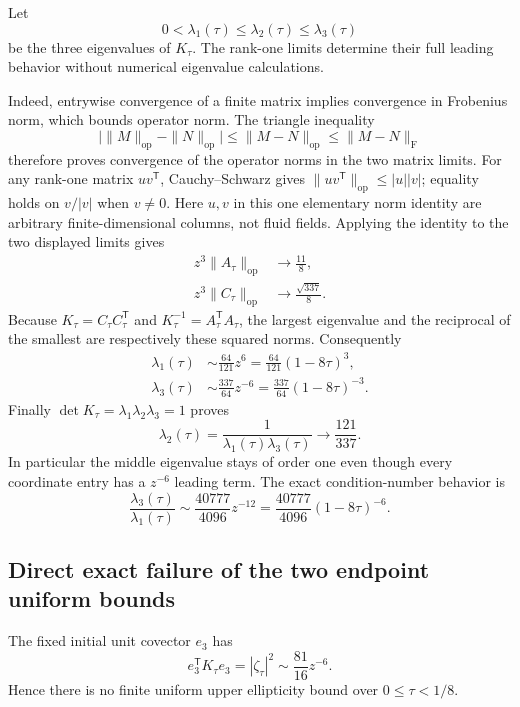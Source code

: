 Let
\[
0<\lambda_1(\tau)\le\lambda_2(\tau)\le\lambda_3(\tau)
\]
be the three eigenvalues of \(K_\tau\). The rank-one limits determine
their full leading behavior without numerical eigenvalue calculations.

Indeed, entrywise convergence of a finite matrix implies convergence in
Frobenius norm, which bounds operator norm. The triangle inequality
\[
\bigl|\|M\|_{\mathrm{op}}-\|N\|_{\mathrm{op}}\bigr|
\le\|M-N\|_{\mathrm{op}}
\le\|M-N\|_{\mathrm{F}}
\]
therefore proves convergence of the operator norms in the two matrix
limits. For any rank-one matrix \(uv^{\mathsf T}\), Cauchy--Schwarz gives
\(\|uv^{\mathsf T}\|_{\mathrm{op}}\le|u||v|\); equality holds on
\(v/|v|\) when \(v\ne0\). Here \(u,v\) in this one elementary norm
identity are arbitrary finite-dimensional columns, not fluid fields.
Applying the identity to the two displayed limits gives
\[
\begin{aligned}
z^3\|A_\tau\|_{\mathrm{op}}
 &\longrightarrow\frac{11}{8},\\
z^3\|C_\tau\|_{\mathrm{op}}
 &\longrightarrow\frac{\sqrt{337}}8.
\end{aligned}
\]
Because \(K_\tau=C_\tau C_\tau^{\mathsf T}\) and
\(K_\tau^{-1}=A_\tau^{\mathsf T}A_\tau\), the largest eigenvalue and the
reciprocal of the smallest are respectively these squared norms.
Consequently
\[
\begin{aligned}
\lambda_1(\tau)
 &\sim\frac{64}{121}z^6
  =\frac{64}{121}(1-8\tau)^3,\\
\lambda_3(\tau)
 &\sim\frac{337}{64}z^{-6}
  =\frac{337}{64}(1-8\tau)^{-3}.
\end{aligned}
\]
Finally \(\det K_\tau=\lambda_1\lambda_2\lambda_3=1\) proves
\[
\lambda_2(\tau)
=\frac1{\lambda_1(\tau)\lambda_3(\tau)}
\longrightarrow\frac{121}{337}.
\]
In particular the middle eigenvalue stays of order one even though every
coordinate entry has a \(z^{-6}\) leading term. The exact condition-number
behavior is
\[
\frac{\lambda_3(\tau)}{\lambda_1(\tau)}
\sim\frac{40777}{4096}z^{-12}
=\frac{40777}{4096}(1-8\tau)^{-6}.
\]

\subsection{Direct exact failure of the two endpoint uniform bounds}

The fixed initial unit covector \(e_3\) has
\[
e_3^{\mathsf T}K_\tau e_3
=|\zeta_\tau|^2
\sim\frac{81}{16}z^{-6}.
\]
Hence there is no finite uniform upper ellipticity bound over
\(0\le\tau<1/8\).

